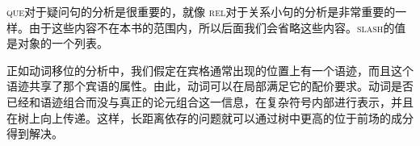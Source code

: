 \ea
{}
\z
\textsc{que}对于疑问句的分析是很重要的，就像 \textsc{rel}对于关系小句的分析是非常重要的一样。由于这些内容不在本书的范围内，所以后面我们会省略这些内容。\textsc{slash}的值是对象的一个列表。

正如动词移位的分析中，我们假定在宾格通常出现的位置上有一个语迹，而且这个语迹共享了那个宾语的属性。由此，动词可以在局部满足它的配价要求。动词是否已经和语迹组合而没与真正的论元组合这一信息，在复杂符号内部进行表示，并且在树上向上传递。这样，长距离依存的问题就可以通过树中更高的位于前场的成分得到解决。

